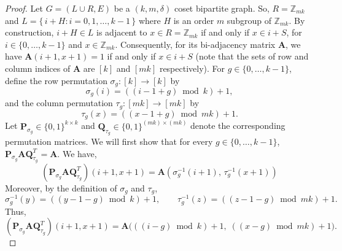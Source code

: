 \documentclass[journal,draftcls,onecolumn]{IEEEtran}
\theoremstyle{mystyle}
\newcommand{\bfA}{\mathbf{A}}
\newcommand{\bfB}{\mathbf{B}}
\newcommand{\bfP}{\mathbf{P}}
\newcommand{\cF}{\mathcal{F}}
\begin{document}
\begin{proof}
Let $G = (L \cup R, E)$ be a  $(k, m, \delta)$ coset bipartite graph. So, $R = \mathbb{Z}_{mk}$ and $L = \{\, i+H : i=0,1,\dots,k-1 \,\}$ where $H$ is an order $m$ subgroup of $\mathbb{Z}_{mk}$. By construction, $i + H \in L$ is adjacent to $x \in R = \mathbb{Z}_{mk}$ if and only if $x \in i + S$, for $i \in \{0, \dots, k-1\}$ and $x \in \mathbb{Z}_{mk}$. Consequently, for its bi-adjacency matrix $\bfA$, we have $\bfA(i+1, x+1) = 1$ if and only if $x \in i + S $ (note that the sets of row and column indices of $\bfA$ are $[k]$ and $[mk]$ respectively).
For $g \in \{ 0, \dots, k-1\}$, define the row permutation $\sigma_g:[k]\to[k]$ by
\[
\sigma_g(i) =  ((i-1+g) \bmod{k}) + 1,
\]
and the column permutation $\tau_g:[mk]\to [mk]$ by
\[
\tau_g(x) =  ((x-1+g) \bmod{mk}) +1 .
\]
Let $\mathbf{P}_{\sigma_g}\in\{0,1\}^{k\times k}$ and $\mathbf{Q}_{\tau_g}\in\{0,1\}^{(mk)\times(mk)}$ denote the corresponding permutation matrices.
We will first show that for every $g\in \{0 , \dots, k-1\}$,
$\bfP_{\sigma_g}\bfA \mathbf{Q}_{\tau_g}^T= \bfA.$
We have,
\[
(\bfP_{\sigma_g}\bfA \mathbf{Q}_{\tau_g}^T )(i+1,x+1)
= \bfA(\sigma_g^{-1}(i+1),\,\tau_g^{-1}(x+1))
\]
Moreover, by the definition of $\sigma_g$ and $\tau_g$,
\[
\sigma_g^{-1}(y) = ((y-1-g)\bmod{k})+1,
\qquad
\tau_g^{-1}(z) = ((z-1-g)\bmod{mk})+1.
\]
Thus,
\[
(\bfP_{\sigma_g}\bfA \mathbf{Q}_{\tau_g}^T )(i+1,x+1)
= \bfA\!\Big( ((i-g)\bmod{k})+1,\; ((x-g)\bmod{mk})+1 \Big).
\]



\end{proof}
\end{document}
